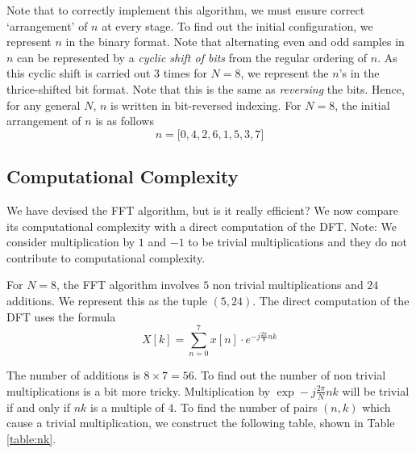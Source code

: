 \documentclass{article}
\theoremstyle{definition}
\begin{document}
Note that to correctly implement this algorithm, we must ensure correct `arrangement' of $n$ at every stage. To find out the initial configuration, we represent $n$ in the binary format. Note that alternating even and odd samples in $n$ can be represented by a \textit{cyclic shift of bits} from the regular ordering of $n$. As this cyclic shift is carried out $3$ times for $N=8$, we represent the $n$'s in the thrice-shifted bit format. Note that this is the same as \textit{reversing} the bits. Hence, for any general $N$, $n$ is written in bit-reversed indexing. For $N=8$, the initial arrangement of $n$ is as follows 
\[
    n = {[} 0, 4, 2, 6, 1,5,3,7 {]}
\]

\subsection{Computational Complexity}

We have devised the FFT algorithm, but is it really efficient? We now compare its computational complexity with a direct computation of the DFT. Note: We consider multiplication by $1$ and $-1$ to be trivial multiplications and they do not contribute to computational complexity. \medskip

For $N=8$, the FFT algorithm involves $5$ non trivial multiplications and $24$ additions. We represent this as the tuple $(5,24)$. The direct computation of the DFT uses the formula 
\[
    X[k] = \sum_{n=0}^{7} x[n] \cdot e^{-j \frac{2\pi}{8} nk}
\]

The number of additions is $8 \times 7 = 56$. To find out the number of non trivial multiplications is a bit more tricky. Multiplication by $\exp -j \frac{2\pi}{N} nk$ will be trivial if and only if $nk$ is a multiple of $4$. To find the number of pairs $(n,k)$ which cause a trivial multiplication, we construct the following table, shown in Table \ref{table:nk}.
\end{document}

